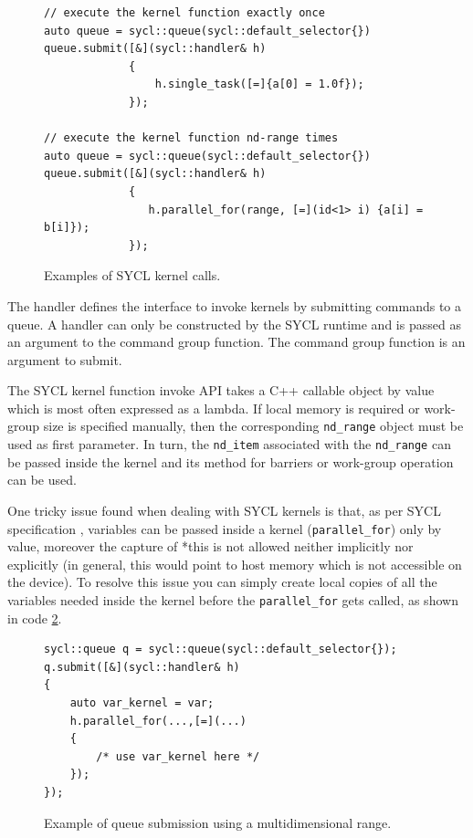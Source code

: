 \begin{figure}[ht!]
\renewcommand{\figurename}{Code}
\begin{verbatim}
// execute the kernel function exactly once
auto queue = sycl::queue(sycl::default_selector{})
queue.submit([&](sycl::handler& h)
             {
                 h.single_task([=]{a[0] = 1.0f});
             });
             
// execute the kernel function nd-range times
auto queue = sycl::queue(sycl::default_selector{})
queue.submit([&](sycl::handler& h)
             {
                h.parallel_for(range, [=](id<1> i) {a[i] = b[i]}); 
             });
\end{verbatim}
\caption{Examples of SYCL kernel calls.}
\label{code:kernel_execution}
\end{figure}

The handler defines the interface to invoke kernels by submitting commands to a queue.
A handler can only be constructed by the SYCL runtime and is passed as an argument to the command group function. The command group function is an argument to submit.

The SYCL kernel function invoke API takes a C++ callable object by value which is most often expressed as a lambda. If local memory is required or work-group size is specified manually, then the corresponding \Verb "nd_range" object must be used as first parameter. In turn, the \Verb "nd_item" associated with the \Verb "nd_range" can be passed inside the kernel and its method for barriers or work-group operation can be used.


One tricky issue found when dealing with SYCL kernels is that, as per SYCL specification \cite{sycl_specification}, variables can be passed inside a kernel (\Verb "parallel_for") only by value, moreover the capture of *this is not allowed neither implicitly nor explicitly (in general, this would point to host memory which is not accessible on the device). To resolve this issue you can simply create local copies of all the variables needed inside the kernel before the \Verb "parallel_for" gets called, as shown in code \ref{code:kernel_variables}.

\begin{figure}[ht!]
\renewcommand{\figurename}{Code}
\begin{verbatim}
sycl::queue q = sycl::queue(sycl::default_selector{});
q.submit([&](sycl::handler& h)
{
    auto var_kernel = var;
    h.parallel_for(...,[=](...)
    {
        /* use var_kernel here */               
    });
});
\end{verbatim}
\caption{Example of queue submission using a multidimensional range.}
\label{code:kernel_variables}
\end{figure}

